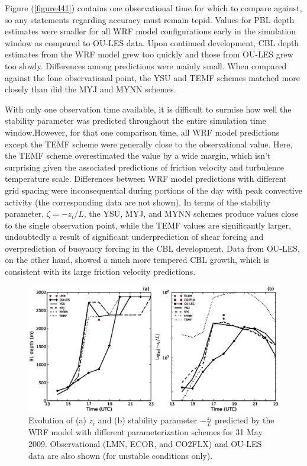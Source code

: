 Figure (\autoref{figure441}) contains one observational time for which to compare against, so any statements regarding accuracy must remain tepid. Values for PBL depth estimates were smaller for all WRF model configurations early in the simulation window as compared to OU-LES data. Upon continued development, CBL depth estimates from the WRF model grew too quickly and those from OU-LES grew too slowly. Differences among predictions were mainly small. When compared against the lone observational point, the YSU and TEMF schemes matched more closely than did the MYJ and MYNN schemes. 

With only one observation time available, it is difficult to surmise how well the stability parameter was predicted throughout the entire simulation time window.However, for that one comparison time, all WRF model predictions except the TEMF scheme were generally close to the observational value. Here, the TEMF scheme overestimated the value by a wide margin, which isn't surprising given the associated predictions of friction velocity and turbulence temperature scale. Differences between WRF model predictions with different grid spacing were inconsequential during portions of the day with peak convective activity (the corresponding data are not shown). In terms of the stability parameter, $\zeta = -z_i / L$, the YSU, MYJ, and MYNN schemes produce values close to the single observation point, while the TEMF values are significantly larger, undoubtedly a result of significant underprediction of shear forcing and overprediction of buoyancy forcing in the CBL development. Data from OU-LES, on the other hand, showed a much more tempered CBL growth, which is consistent with its large friction velocity predictions. 


\begin{figure}[ht!]
\begin{center}
\includegraphics[width=\textwidth]{figures/chapter4/pblh_phi_phys_20090531}
\end{center}
\caption{Evolution of (a) $z_i$ and (b) stability parameter $-\frac{z_i}{L}$ predicted by the WRF model with different parameterization schemes for 31 May 2009. Observational (LMN, ECOR, and CO2FLX) and OU-LES data are also shown (for unstable conditions only).}
\label{figure441}
\end{figure}


